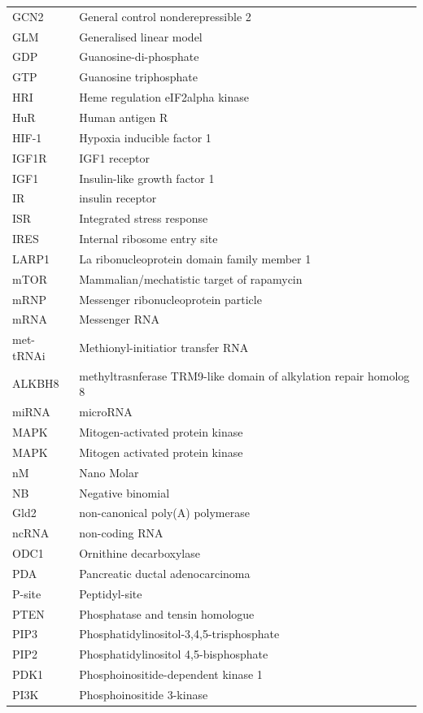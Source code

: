 \documentclass[12pt,openany]{book}
\begin{document}
\begin{longtable}{ll}
GCN2 & General control nonderepressible 2\\
\addlinespace
GLM & Generalised linear model\\
GDP & Guanosine-di-phosphate\\
GTP & Guanosine triphosphate\\
HRI & Heme regulation eIF2alpha kinase\\
HuR & Human antigen R\\
\addlinespace
HIF-1 & Hypoxia inducible factor 1\\
IGF1R & IGF1 receptor\\
IGF1 & Insulin-like growth factor 1\\
IR & insulin receptor\\
ISR & Integrated stress response\\
\addlinespace
IRES & Internal ribosome entry site\\
LARP1 & La ribonucleoprotein domain family member 1\\
mTOR & Mammalian/mechatistic target of rapamycin\\
mRNP & Messenger ribonucleoprotein particle\\
mRNA & Messenger RNA\\
\addlinespace
met-tRNAi & Methionyl-initiatior transfer RNA\\
ALKBH8 & methyltrasnferase TRM9-like domain of alkylation repair homolog 8\\
miRNA & microRNA\\
MAPK & Mitogen-activated protein
kinase\\
MAPK & Mitogen activated protein kinase\\
\addlinespace
nM & Nano Molar\\
NB & Negative binomial\\
Gld2 & non-canonical poly(A) polymerase\\
ncRNA & non-coding RNA\\
ODC1 & Ornithine decarboxylase\\
\addlinespace
PDA & Pancreatic ductal adenocarcinoma\\
P-site & Peptidyl-site\\
PTEN & Phosphatase and tensin homologue\\
PIP3 & Phosphatidylinositol-3,4,5-trisphosphate\\
PIP2 & Phosphatidylinositol 4,5-bisphosphate\\
\addlinespace
PDK1 & Phosphoinositide-dependent kinase 1\\
PI3K & Phosphoinositide 3-kinase\\

\end{longtable}
\end{document}
